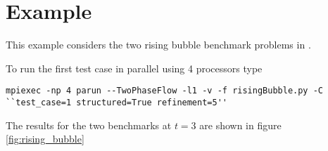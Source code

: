 \documentclass[english,11pt]{article}
\let\cite=\citet
\begin{document}
\section{Example}
This example considers the two rising bubble benchmark problems in \cite{hysing2009quantitative}. 



\vspace{2ex}
To run the first test case in parallel using 4 processors type 

\begin{lstlisting}[frame=single]
  mpiexec -np 4 parun --TwoPhaseFlow -l1 -v -f risingBubble.py -C ``test_case=1 structured=True refinement=5''
\end{lstlisting}

The results for the two benchmarks at $t=3$ are shown in figure \ref{fig:rising_bubble} 




%
%

\end{document}
